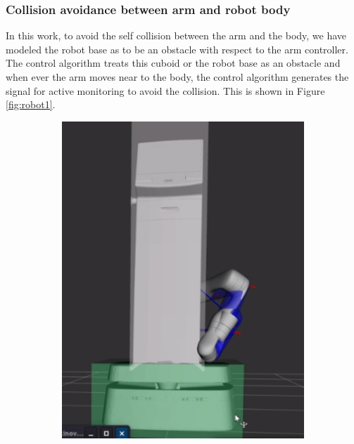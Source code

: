 \documentclass[a4paper, 11.5pt, conference]{ieeeconf}      %
\begin{document}
\subsubsection{Collision avoidance between arm and robot body}
In this work, to avoid the self collision between the arm and the body, we have modeled the robot base as to be an obstacle with respect to the arm controller. The control algorithm treats this cuboid or the robot base as an obstacle and when ever the arm moves near to the body, the control algorithm generates the signal for active monitoring to avoid the collision. This is shown in Figure \ref{fig:robot1}.

\begin{figure}[H]
	\centering
	\label{potential}
	\begin{subfigure}[t]{0.20\textwidth}
		\centering
		\includegraphics[scale=0.273]{images/robot1.png}
		

\end{subfigure}
\end{figure}
\end{document}

